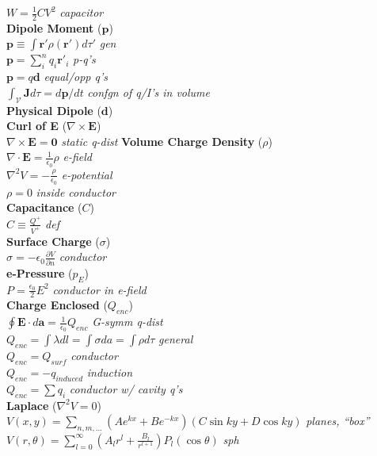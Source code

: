 \documentclass[9pt]{extarticle}
\begin{document}
\begin{multicols}{3}
$W = \frac{1}{2}CV^{2}$ \textit{capacitor} \\
\textbf{Dipole Moment} ($\mathbf{p}$) \\
$\mathbf{p} \equiv \int{\mathbf{r}' \rho(\mathbf{r}') d\tau'}$ \textit{gen} \\
$\mathbf{p} = \sum_{i}^{n}q_{i}\mathbf{r'}_{i}$ \textit{p-q's} \\
$\mathbf{p} = q\mathbf{d}$ \textit{equal/opp q's} \\
$\int_{\mathcal{V}} \mathbf{J}d\tau = d\mathbf{p}/dt$ \textit{confgn of q/I's in volume} \\
\textbf{Physical Dipole} ($\mathbf{d}$) \\
\textbf{Curl of E} ($\nabla\times\mathbf{E}$)\\
$\nabla\times\mathbf{E} = \mathbf{0}$ \textit{static q-dist}
\textbf{Volume Charge Density} ($\rho$) \\
$\nabla\cdot\mathbf{E} = \frac{1}{\epsilon_{0}}\rho$ \textit{e-field} \\
$\nabla^{2}V = -\frac{\rho}{\epsilon_{0}}$ \textit{e-potential} \\
$\rho = 0$ \textit{inside conductor} \\
\textbf{Capacitance} ($C$) \\
$C \equiv \frac{Q^{+}}{V^{+}}$ \textit{def} \\
\textbf{Surface Charge} ($\sigma$) \\
$\sigma = -\epsilon_{0}\frac{\partial V}{\partial n}$ \textit{conductor} \\
\textbf{e-Pressure} ($p_{E}$) \\
$P = \frac{\epsilon_{0}}{2}E^{2}$ \textit{conductor in e-field} \\
\textbf{Charge Enclosed} ($Q_{enc}$) \\
$\oint\mathbf{E}\cdot d\mathbf{a} = \frac{1}{\epsilon_{0}}Q_{enc}$ \textit{G-symm q-dist} \\
$Q_{enc} = \int\lambda dl = \int\sigma da = \int\rho d\tau$ \textit{general} \\
$Q_{enc} = Q_{surf}$ \textit{conductor} \\
$Q_{enc} = -q_{induced}$ \textit{induction} \\
$Q_{enc} = \sum q_{i}$ \textit{conductor w/ cavity q's} \\
\textbf{Laplace} ($\nabla^{2}V = 0$) \\
$V(x, y) = \sum_{n,m,\ldots}(Ae^{kx} + Be^{-kx})(C\sin{ky} + D\cos{ky})$  \textit{planes, ``box''} \\
$V(r, \theta) = \sum_{l=0}^{\infty} \left(A_{l}r^{l} + \frac{B_{l}}{r^{l + 1}}\right)P_{l}(\cos{\theta})$ \textit{sph} \\

\end{multicols}
\end{document}
